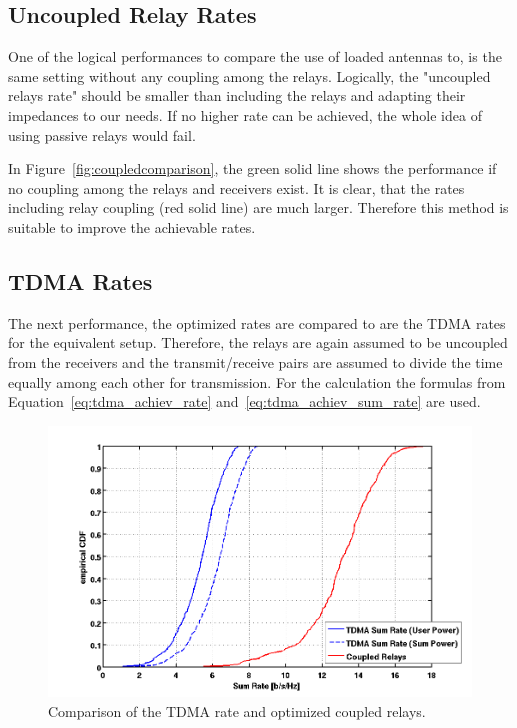 \subsection{Uncoupled Relay Rates}
One of the logical performances to compare the use of loaded antennas to, is the same setting without any coupling among the relays.
Logically, the "uncoupled relays rate" should be smaller than including the relays and adapting their impedances to our needs.
If no higher rate can be achieved, the whole idea of using passive relays would fail.


In Figure~\ref{fig:coupledcomparison}, the green solid line shows the performance if no coupling among the relays and receivers exist.
It is clear, that the rates including relay coupling (red solid line) are much larger.
Therefore this method is suitable to improve the achievable rates.


\subsection{TDMA Rates}
The next performance, the optimized rates are compared to are the TDMA rates for the equivalent setup.
Therefore, the relays are again assumed to be uncoupled from the receivers and the transmit/receive pairs are assumed to divide the time equally among each other for transmission.
For the calculation the formulas from Equation~\eqref{eq:tdma_achiev_rate} and~\eqref{eq:tdma_achiev_sum_rate} are used.

\begin{figure}[h]
\centering
  \includegraphics[width=0.9\linewidth]{images/TDMAcomparison.png}
\caption{Comparison of the TDMA rate and optimized coupled relays.}
\label{fig:TDMAcomparison}
\end{figure}


